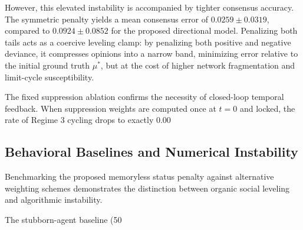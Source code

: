 However, this elevated instability is accompanied by tighter consensus accuracy\cite{degroot1974reaching}. The symmetric penalty yields a mean consensus error of $0.0259 \pm 0.0319$, compared to $0.0924 \pm 0.0852$ for the proposed directional model\cite{acemoglu2013opinion}. Penalizing both tails acts as a coercive leveling clamp: by penalizing both positive and negative deviance, it compresses opinions into a narrow band, minimizing error relative to the initial ground truth $\mu^*$, but at the cost of higher network fragmentation and limit-cycle susceptibility\cite{degroot1974reaching,acemoglu2013opinion}.

The fixed suppression ablation confirms the necessity of closed-loop temporal feedback\cite{degroot1974reaching}. When suppression weights are computed once at $t = 0$ and locked, the rate of Regime 3 cycling drops to exactly 0.00%

\subsection{Behavioral Baselines and Numerical Instability}
Benchmarking the proposed memoryless status penalty against alternative weighting schemes demonstrates the distinction between organic social leveling and algorithmic instability\cite{degroot1974reaching}.

The stubborn-agent baseline (50%

